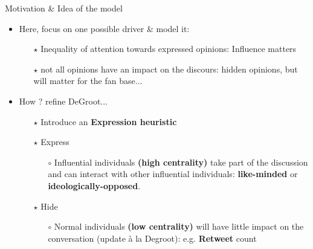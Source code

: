 \documentclass[xcolor=table,handout]{beamer}
\begin{document}
\begin{frame}{Motivation \& Idea of the model}
\begin{itemize} \setlength\itemsep{1em}
	\item Here, focus on one possible driver \& model it: 
		\begin{itemize} \setlength\itemsep{1em}
			\item[$\star$] Inequality of attention towards expressed opinions: Influence matters
			\item[$\star$] not all opinions have an impact on the discours: hidden opinions, but will matter for the fan base... 
		\end{itemize}
	\item How ? refine DeGroot...
		\begin{itemize}  \setlength\itemsep{1em}
			\item[$\star$] Introduce an {\bf\color{purple}Expression heuristic}
			\item[$\star$] Express  \begin{itemize} \item[$\circ$] Influential individuals {\bf\color{purple}(high centrality)} take part of the discussion and can interact with other influential individuals: {\bf\color{purple}like-minded} or {\bf\color{purple}ideologically-opposed}. \end{itemize}
			\item[$\star$] Hide \begin{itemize} \item[$\circ$] Normal individuals {\bf\color{purple}(low centrality)} will have little impact on the conversation (update \`{a} la Degroot): e.g. {\bf\color{purple}Retweet} count  \end{itemize}
		\end{itemize}
\end{itemize}
\end{frame}
\end{document}
